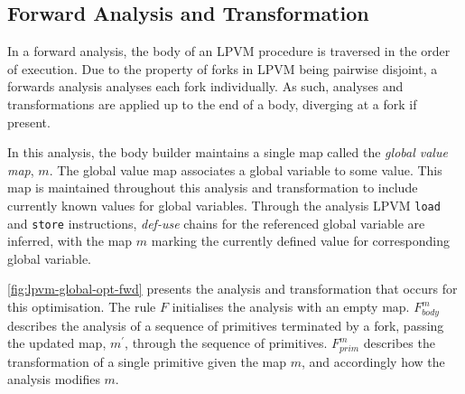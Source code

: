 \subsection{Forward Analysis and Transformation}
\label{ssec:global-opt-fwd}

In a forward analysis, the body of an LPVM procedure is traversed in the order of execution. Due to the property of forks in LPVM being pairwise disjoint, a forwards analysis analyses each fork individually. As such, analyses and transformations are applied up to the end of a body, diverging at a fork if present.

In this analysis, the body builder maintains a single map called the \textit{global value map}, $m$. The global value map associates a global variable to some value. This map is maintained throughout this analysis and transformation to include currently known values for global variables. Through the analysis LPVM \texttt{load} and \texttt{store} instructions, \textit{def-use} chains for the referenced global variable are inferred, with the map $m$ marking the currently defined value for corresponding global variable. 

\cref{fig:lpvm-global-opt-fwd} presents the analysis and transformation that occurs for this optimisation. The rule $F$ initialises the analysis with an empty map. $F_{body}^m$ describes the analysis of a sequence of primitives terminated by a fork, passing the updated map, $m^\prime$, through the sequence of primitives. $F_{prim}^m$ describes the transformation of a single primitive given the map $m$, and accordingly how the analysis modifies $m$.

